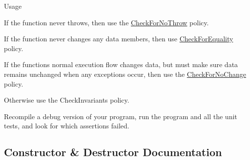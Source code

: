 \begin{DoxyParagraph}{Usage}
\begin{DoxyEnumerate}
\begin{DoxyItemize}
\item If the function never throws, then use the \hyperlink{classLoki_1_1CheckForNoThrow}{Check\+For\+No\+Throw} policy.
\item If the function never changes any data members, then use \hyperlink{classLoki_1_1CheckForEquality}{Check\+For\+Equality} policy.
\item If the function\textquotesingle{}s normal execution flow changes data, but must make sure data remains unchanged when any exceptions occur, then use the \hyperlink{classLoki_1_1CheckForNoChange}{Check\+For\+No\+Change} policy.
\item Otherwise use the Check\+Invariants policy.
\end{DoxyItemize}
\item Recompile a debug version of your program, run the program and all the unit tests, and look for which assertions failed. 
\end{DoxyEnumerate}
\end{DoxyParagraph}


\subsection{Constructor \& Destructor Documentation}
\hypertarget{classLoki_1_1ContractChecker_a47a88a788d4099204e3a49593e4ff2a2}{}

